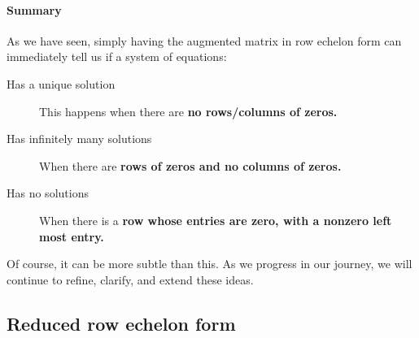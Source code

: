 \documentclass{ximera}
\begin{document}
\paragraph{Summary}

As we have seen, simply having the augmented matrix in row echelon form can immediately tell us if a system of equations:
\begin{description}
\item[Has a unique solution] This happens when there are \textbf{no rows/columns of zeros.}
\item[Has infinitely many solutions] When there are \textbf{rows of
  zeros and no columns of zeros.}
\item[Has no solutions] When there is a \textbf{row whose entries are
  zero, with a nonzero left most entry.}
\end{description}
Of course, it can be more subtle than this. As we progress in our
journey, we will continue to refine, clarify, and extend these ideas.





\subsection{Reduced row echelon form}
\end{document}
